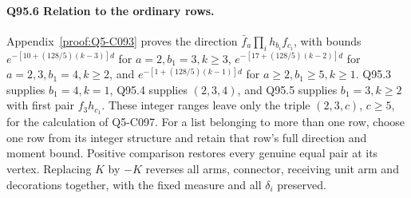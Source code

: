 \paragraph{Q95.6 Relation to the ordinary rows.}
Appendix~\ref{proof:Q5-C093} proves the direction
\(\bar f_a\prod_i h_{b_i}f_{c_i}\), with bounds
\(e^{-[10+(128/5)(k-3)]d}\) for \(a=\allowbreak 2,\allowbreak b_1=\allowbreak 3,\allowbreak k\ge\allowbreak 3\),
\(e^{-[17+(128/5)(k-2)]d}\) for \(a=\allowbreak 2,\allowbreak 3,\allowbreak b_1=\allowbreak 4,\allowbreak k\ge\allowbreak 2\), and
\(e^{-[1+(128/5)(k-1)]d}\) for \(a\ge\allowbreak 2,\allowbreak b_1\ge\allowbreak 5,\allowbreak k\ge\allowbreak 1\).
Q95.3 supplies \(b_1=\allowbreak 4,\allowbreak k=\allowbreak 1\), Q95.4 supplies \((2,\allowbreak 3,\allowbreak 4)\), and
Q95.5 supplies \(b_1=\allowbreak 3,\allowbreak k\ge\allowbreak 2\) with first pair \(f_3h_{c_1}\).
These integer ranges leave only the triple \((2,\allowbreak 3,\allowbreak c)\), \(c\ge\allowbreak 5\),
for the calculation of Q5-C097.
For a list belonging to more than one row, choose one row from its
integer structure and retain that row's full direction and moment bound.
Positive comparison restores every genuine equal pair at its vertex.
Replacing \(K\) by \(-K\) reverses all arms, connector, receiving
unit arm and decorations together, with the fixed measure and
all \(\delta_i\) preserved.
